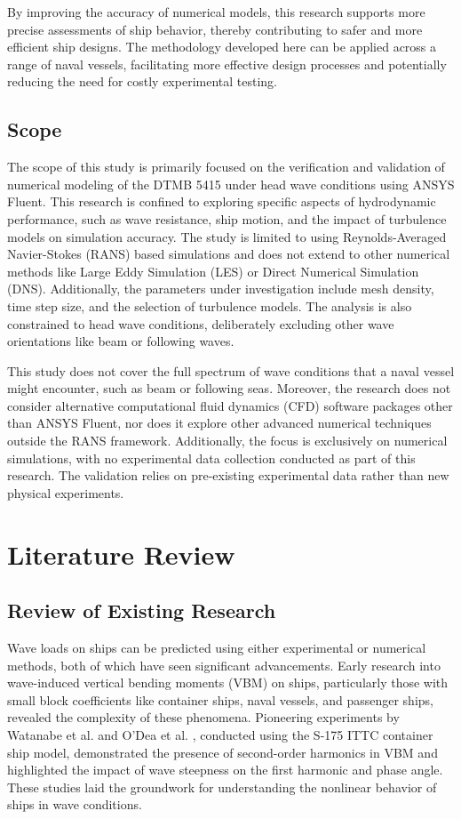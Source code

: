 \documentclass[12pt]{article} %
\begin{document}
By improving the accuracy of numerical models, this research supports more precise assessments of 
ship behavior, thereby contributing to safer and more efficient ship designs. The methodology 
developed here can be applied across a range of naval vessels, facilitating more effective design 
processes and potentially reducing the need for costly experimental testing.

\subsection{Scope}

The scope of this study is primarily focused on the verification and validation of numerical 
modeling of the DTMB 5415 under head wave conditions using ANSYS Fluent. This research is confined 
to exploring specific aspects of hydrodynamic performance, such as wave resistance, ship motion, 
and the impact of turbulence models on simulation accuracy. The study is limited to using 
Reynolds-Averaged Navier-Stokes (RANS) based simulations and does not extend to other numerical 
methods like Large Eddy Simulation (LES) or Direct Numerical Simulation (DNS). Additionally, the 
parameters under investigation include mesh density, time step size, and the selection of turbulence 
models. The analysis is also constrained to head wave conditions, deliberately excluding other wave 
orientations like beam or following waves.


This study does not cover the full spectrum of wave conditions that a naval vessel might encounter, 
such as beam or following seas. Moreover, the research does not consider alternative computational 
fluid dynamics (CFD) software packages other than ANSYS Fluent, nor does it explore other advanced 
numerical techniques outside the RANS framework. Additionally, the focus is exclusively on numerical 
simulations, with no experimental data collection conducted as part of this research. The validation 
relies on pre-existing experimental data rather than new physical experiments.



\section{Literature Review}

\subsection{Review of Existing Research}
Wave loads on ships can be predicted using either experimental or numerical methods, both of which 
have seen significant advancements. Early research into wave-induced vertical bending moments (VBM) 
on ships, particularly those with small block coefficients like container ships, naval vessels, and 
passenger ships, revealed the complexity of these phenomena. Pioneering experiments by Watanabe et 
al. \cite{Watanabe1989} and O'Dea et al. \cite{ODea1992}, conducted using the S-175 ITTC container 
ship model, demonstrated the presence of second-order harmonics in VBM and highlighted the impact of 
wave steepness on the first harmonic and phase angle. These studies laid the groundwork for 
understanding the nonlinear behavior of ships in wave conditions.
\end{document}
